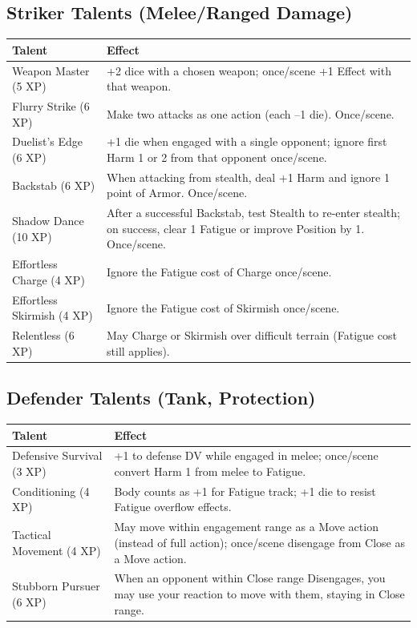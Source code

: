 \subsection{Striker Talents (Melee/Ranged Damage)}

\begin{tabular}{@{}lp{10cm}@{}}
\toprule
\textbf{Talent} & \textbf{Effect} \\
\midrule
Weapon Master (5 XP) & +2 dice with a chosen weapon; once/scene +1 Effect with that weapon. \\
Flurry Strike (6 XP) & Make two attacks as one action (each --1 die). Once/scene. \\
Duelist's Edge (6 XP) & +1 die when engaged with a single opponent; ignore first Harm 1 or 2 from that opponent once/scene. \\
Backstab (6 XP) & When attacking from stealth, deal +1 Harm and ignore 1 point of Armor. Once/scene. \\
Shadow Dance (10 XP) & After a successful Backstab, test Stealth to re-enter stealth; on success, clear 1 Fatigue or improve Position by 1. Once/scene. \\
Effortless Charge (4 XP) & Ignore the Fatigue cost of Charge once/scene. \\
Effortless Skirmish (4 XP) & Ignore the Fatigue cost of Skirmish once/scene. \\
Relentless (6 XP) & May Charge or Skirmish over difficult terrain (Fatigue cost still applies). \\
\bottomrule
\end{tabular}

\subsection{Defender Talents (Tank, Protection)}

\begin{tabular}{@{}lp{10cm}@{}}
\toprule
\textbf{Talent} & \textbf{Effect} \\
\midrule
Defensive Survival (3 XP) & +1 to defense DV while engaged in melee; once/scene convert Harm 1 from melee to Fatigue. \\
Conditioning (4 XP) & Body counts as +1 for Fatigue track; +1 die to resist Fatigue overflow effects. \\
Tactical Movement (4 XP) & May move within engagement range as a Move action (instead of full action); once/scene disengage from Close as a Move action. \\
Stubborn Pursuer (6 XP) & When an opponent within Close range Disengages, you may use your reaction to move with them, staying in Close range. \\
\bottomrule
\end{tabular}

